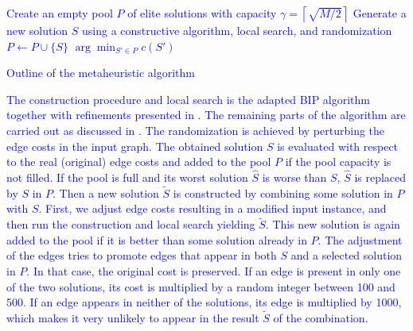 \begin{algorithm}
\textcolor{blue}{
Create an empty pool $P$ of elite solutions with capacity $\gamma=\left\lceil\sqrt{M/2}\right\rceil$\;
 {
Generate a new solution $S$ using a constructive algorithm, local search, and randomization\;
 {$P\leftarrow P\cup \{S\}$}
}
\Return $\arg\min_{S'\in P} c(S')$\;
 \caption{Outline of the metaheuristic algorithm}
}
\label{alg:meta}
\end{algorithm}
\textcolor{blue}{The construction procedure and local search is the adapted BIP algorithm together with refinements presented in \citet{ivanova16isco}.
The remaining parts of the algorithm are carried out as discussed in \citet{pajor18}.
The randomization is achieved by perturbing the edge costs in the input graph.
The obtained solution $S$ is evaluated with respect to the real (original) edge costs and added to the pool $P$ if the pool capacity is not filled.
If the pool is full and its worst solution $\hat{S}$ is worse than $S$, $\hat{S}$ is replaced by $S$ in $P$.
Then a new solution $\tilde{S}$ is constructed by combining some solution in $P$ with $S$. 
First, we adjust edge costs resulting in a modified input instance, 
and then run the construction and local search yielding $\tilde{S}$.
This new solution is again added to the pool if it is better than some solution already in $P$.
The adjustment of the edges tries to promote edges that appear in both $S$ and a selected solution in $P$. 
In that case, the original cost is preserved.
If an edge is present in only one of the two solutions, its cost is multiplied by a random integer between 100 and 500.
If an edge appears in neither of the solutions, its edge is multiplied by 1000, which makes it very unlikely to appear in the result $\tilde{S}$ of the combination.
}
